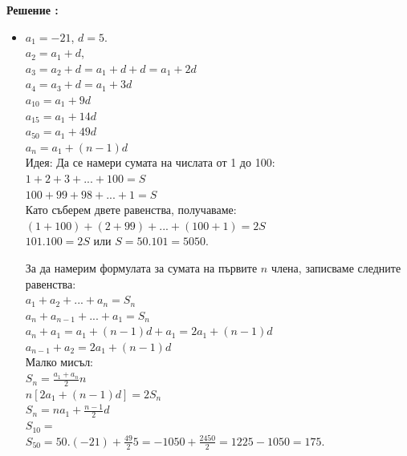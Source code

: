 \documentclass{article}
\newcounter{solution}
\newcommand\solution{%
	\stepcounter{solution}%
	\textbf{Решение :}\\%
}
\begin{document}
\solution
	\begin{itemize}
	\item  $a_1 = -21 $, $d = 5 $. \\
	$a_2 = a_1 +d $,\\ 
	$a_3 = a_2 + d = a_1 + d + d = a_1 + 2d $ \\
	$a_4 = a_3 + d = a_1 + 3d $ \\
	$a_{10} = a_1 + 9d  $ \\
	$a_{15} = a_1 + 14d $ \\
	$a_{50} = a_1 + 49d $ \\
	$a_n = a_1 +(n-1)d $ \\
	
	
	Идея: Да се намери сумата на числата от 1 до 100: \\
	$1 + 2 + 3 + ... + 100 = S $ \\
	$100 + 99 + 98 + ... + 1 = S $ \\
	Като съберем двете равенства, получаваме: \\
	$(1+100) + (2+99) + ... + (100+1) = 2S $ \\
	$101.100 = 2S $ или $S = 50.101 = 5050 $.
	
	
	За да намерим формулата за сумата на първите $n$ члена, записваме следните равенства: \\
	$a_1 + a_2 + ... + a_n = S_n  $ \\
	$a_n + a_{n-1} + ... + a_1 = S_n $ \\
	
	
	$a_n + a_1 = a_1 + (n-1)d + a_1 = 2a_1 + (n-1)d $ \\
	$a_{n-1} + a_2  = 2a_1 + (n-1)d $ \\
	Малко мисъл:\\
	$S_n = \frac{a_1 + a_n}{2}n $ \\
	$n[2a_1 + (n-1)d] = 2S_n $ \\
	$ S_n = na_1 + \frac{n-1}{2}d $ \\
	
	
	$S_{10} =   $ \\
	 $S_{50} = 50.(-21) + \frac{49}{2}5 = -1050 +  \frac{2450}{2} = 1225 - 1050 = 175. $
	
\end{itemize}
\end{document}
